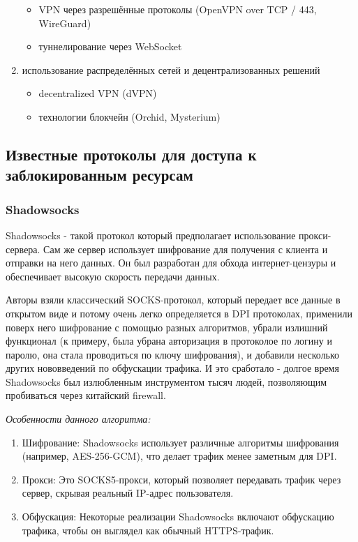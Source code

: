 \documentclass[utf8,14pt,a4paper,oneside,russian]{book}
\begin{document}
\begin{enumerate}
\begin{itemize}
              \item VPN через разрешённые протоколы (OpenVPN over TCP / 443, WireGuard)
              \item туннелирование через WebSocket
          \end{itemize}
    \item  использование распределённых сетей и децентрализованных решений
          \begin{itemize}
              \item decentralized VPN (dVPN)
              \item технологии блокчейн (Orchid, Mysterium)
          \end{itemize}
\end{enumerate}

\subsection{Известные протоколы для доступа к заблокированным ресурсам}

\subsubsection{Shadowsocks}
Shadowsocks - такой протокол который предполагает использование прокси-сервера. Сам же сервер использует шифрование для получения
с клиента и отправки на него данных. Он был разработан для обхода интернет-цензуры и обеспечивает высокую скорость передачи данных.

Авторы взяли классический SOCKS-протокол, который передает все данные в открытом виде и потому очень легко определяется в DPI протоколах,
применили поверх него шифрование с помощью разных алгоритмов, убрали излишний функционал (к примеру, была убрана авторизация в протоколое
по логину и паролю, она стала проводиться по ключу шифрования), и добавили несколько других нововведений по обфускации трафика. И это
сработало - долгое время Shadowsocks был излюбленным инструментом тысяч людей, позволяющим пробиваться через китайский firewall.

\textit{Особенности данного алгоритма:}
\begin{enumerate}
    \item Шифрование: Shadowsocks использует различные алгоритмы шифрования (например, AES-256-GCM), что делает трафик менее заметным для DPI.
    \item Прокси: Это SOCKS5-прокси, который позволяет передавать трафик через сервер, скрывая реальный IP-адрес пользователя.
    \item Обфускация: Некоторые реализации Shadowsocks включают обфускацию трафика, чтобы он выглядел как обычный HTTPS-трафик.
\end{enumerate}
\end{document}
